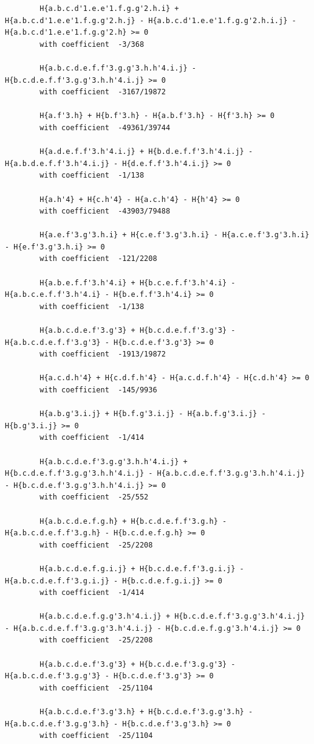 \documentclass[11pt, a4paper]{kybernetika}
\begin{document}
\begin{verbatim}
		H{a.b.c.d'1.e.e'1.f.g.g'2.h.i} + H{a.b.c.d'1.e.e'1.f.g.g'2.h.j} - H{a.b.c.d'1.e.e'1.f.g.g'2.h.i.j} - H{a.b.c.d'1.e.e'1.f.g.g'2.h} >= 0
		with coefficient  -3/368
		
		H{a.b.c.d.e.f.f'3.g.g'3.h.h'4.i.j} - H{b.c.d.e.f.f'3.g.g'3.h.h'4.i.j} >= 0
		with coefficient  -3167/19872
		
		H{a.f'3.h} + H{b.f'3.h} - H{a.b.f'3.h} - H{f'3.h} >= 0
		with coefficient  -49361/39744
		
		H{a.d.e.f.f'3.h'4.i.j} + H{b.d.e.f.f'3.h'4.i.j} - H{a.b.d.e.f.f'3.h'4.i.j} - H{d.e.f.f'3.h'4.i.j} >= 0
		with coefficient  -1/138
		
		H{a.h'4} + H{c.h'4} - H{a.c.h'4} - H{h'4} >= 0
		with coefficient  -43903/79488
		
		H{a.e.f'3.g'3.h.i} + H{c.e.f'3.g'3.h.i} - H{a.c.e.f'3.g'3.h.i} - H{e.f'3.g'3.h.i} >= 0
		with coefficient  -121/2208
		
		H{a.b.e.f.f'3.h'4.i} + H{b.c.e.f.f'3.h'4.i} - H{a.b.c.e.f.f'3.h'4.i} - H{b.e.f.f'3.h'4.i} >= 0
		with coefficient  -1/138
		
		H{a.b.c.d.e.f'3.g'3} + H{b.c.d.e.f.f'3.g'3} - H{a.b.c.d.e.f.f'3.g'3} - H{b.c.d.e.f'3.g'3} >= 0
		with coefficient  -1913/19872
		
		H{a.c.d.h'4} + H{c.d.f.h'4} - H{a.c.d.f.h'4} - H{c.d.h'4} >= 0
		with coefficient  -145/9936
		
		H{a.b.g'3.i.j} + H{b.f.g'3.i.j} - H{a.b.f.g'3.i.j} - H{b.g'3.i.j} >= 0
		with coefficient  -1/414
		
		H{a.b.c.d.e.f'3.g.g'3.h.h'4.i.j} + H{b.c.d.e.f.f'3.g.g'3.h.h'4.i.j} - H{a.b.c.d.e.f.f'3.g.g'3.h.h'4.i.j} - H{b.c.d.e.f'3.g.g'3.h.h'4.i.j} >= 0
		with coefficient  -25/552
		
		H{a.b.c.d.e.f.g.h} + H{b.c.d.e.f.f'3.g.h} - H{a.b.c.d.e.f.f'3.g.h} - H{b.c.d.e.f.g.h} >= 0
		with coefficient  -25/2208
		
		H{a.b.c.d.e.f.g.i.j} + H{b.c.d.e.f.f'3.g.i.j} - H{a.b.c.d.e.f.f'3.g.i.j} - H{b.c.d.e.f.g.i.j} >= 0
		with coefficient  -1/414
		
		H{a.b.c.d.e.f.g.g'3.h'4.i.j} + H{b.c.d.e.f.f'3.g.g'3.h'4.i.j} - H{a.b.c.d.e.f.f'3.g.g'3.h'4.i.j} - H{b.c.d.e.f.g.g'3.h'4.i.j} >= 0
		with coefficient  -25/2208
		
		H{a.b.c.d.e.f'3.g'3} + H{b.c.d.e.f'3.g.g'3} - H{a.b.c.d.e.f'3.g.g'3} - H{b.c.d.e.f'3.g'3} >= 0
		with coefficient  -25/1104
		
		H{a.b.c.d.e.f'3.g'3.h} + H{b.c.d.e.f'3.g.g'3.h} - H{a.b.c.d.e.f'3.g.g'3.h} - H{b.c.d.e.f'3.g'3.h} >= 0
		with coefficient  -25/1104
		

\end{verbatim}
\end{document}
